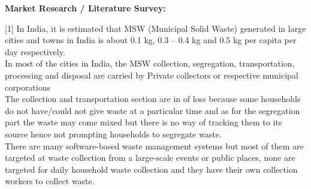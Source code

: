 \textup{\large {\bf Market Research / Literature Survey: } \\[0.20in] }


\Large  { [1] In India, it is estimated that MSW (Municipal Solid Waste) generated in large cities and towns in India is about 0.1 kg, 0.3 – 0.4 kg and 0.5 kg per capita per day respectively. }\\

\Large  {	In most of the cities in India, the MSW collection, segregation, transportation, processing and disposal are carried by Private collectors or respective municipal corporations }\\[0.003in]
	
\Large {	The collection and transportation section are in of loss because some households do not have/could not give waste at a particular time and as for the segregation part the waste may come mixed but there is no way of tracking them to its source hence not prompting households to segregate waste.}\\[0.003in]
	
\Large {	There are many software-based waste management systems but most of them are targeted at waste collection from a large-scale events or public places, none are targeted for daily household waste collection and they have their own collection workers to collect waste. }\\[0.3in]
\newpage

